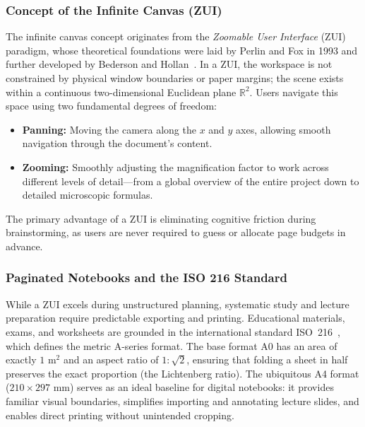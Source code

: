 \documentclass[12pt, a4paper, oneside]{article}
\begin{document}
\subsubsection{Concept of the Infinite Canvas (ZUI)}
The infinite canvas concept originates from the \textit{Zoomable User Interface} (ZUI) paradigm, whose theoretical foundations were laid by Perlin and Fox in 1993 and further developed by Bederson and Hollan~\cite{bederson1994pad}. In a ZUI, the workspace is not constrained by physical window boundaries or paper margins; the scene exists within a continuous two-dimensional Euclidean plane $\mathbb{R}^2$. Users navigate this space using two fundamental degrees of freedom:
\begin{itemize}
    \item \textbf{Panning:} Moving the camera along the $x$ and $y$ axes, allowing smooth navigation through the document's content.
    \item \textbf{Zooming:} Smoothly adjusting the magnification factor to work across different levels of detail---from a global overview of the entire project down to detailed microscopic formulas.
\end{itemize}

The primary advantage of a ZUI is eliminating cognitive friction during brainstorming, as users are never required to guess or allocate page budgets in advance.

\subsubsection{Paginated Notebooks and the ISO 216 Standard}
While a ZUI excels during unstructured planning, systematic study and lecture preparation require predictable exporting and printing. Educational materials, exams, and worksheets are grounded in the international standard ISO~216~\cite{iso216}, which defines the metric A-series format. The base format A0 has an area of exactly $1\text{ m}^2$ and an aspect ratio of $1 : \sqrt{2}$, ensuring that folding a sheet in half preserves the exact proportion (the Lichtenberg ratio). The ubiquitous A4 format ($210 \times 297\text{ mm}$) serves as an ideal baseline for digital notebooks: it provides familiar visual boundaries, simplifies importing and annotating lecture slides, and enables direct printing without unintended cropping.

\end{document}
